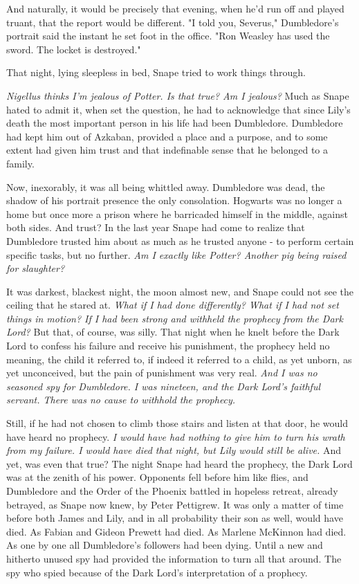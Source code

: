 And naturally, it would be precisely that evening, when he'd run off and played truant, that the report would be different. "I told you, Severus," Dumbledore's portrait said the instant he set foot in the office. "Ron Weasley has used the sword. The locket is destroyed."

That night, lying sleepless in bed, Snape tried to work things through.

\emph{Nigellus thinks I'm jealous of Potter. Is that true? Am I jealous?} Much as Snape hated to admit it, when set the question, he had to acknowledge that since Lily's death the most important person in his life had been Dumbledore. Dumbledore had kept him out of Azkaban, provided a place and a purpose, and to some extent had given him trust and that indefinable sense that he belonged to a family.

Now, inexorably, it was all being whittled away. Dumbledore was dead, the shadow of his portrait presence the only consolation. Hogwarts was no longer a home but once more a prison where he barricaded himself in the middle, against both sides. And trust? In the last year Snape had come to realize that Dumbledore trusted him about as much as he trusted anyone - to perform certain specific tasks, but no further. \emph{Am I exactly like Potter? Another pig being raised for slaughter?}

It was darkest, blackest night, the moon almost new, and Snape could not see the ceiling that he stared at. \emph{What if I had done differently? What if I had not set things in motion? If I had been strong and withheld the prophecy from the Dark Lord?} But that, of course, was silly. That night when he knelt before the Dark Lord to confess his failure and receive his punishment, the prophecy held no meaning, the child it referred to, if indeed it referred to a child, as yet unborn, as yet unconceived, but the pain of punishment was very real. \emph{And I was no seasoned spy for Dumbledore. I was nineteen, and the Dark Lord's faithful servant. There was no cause to withhold the prophecy.}

Still, if he had not chosen to climb those stairs and listen at that door, he would have heard no prophecy. \emph{I would have had nothing to give him to turn his wrath from my failure. I would have died that night, but Lily would still be alive.} And yet, was even that true? The night Snape had heard the prophecy, the Dark Lord was at the zenith of his power. Opponents fell before him like flies, and Dumbledore and the Order of the Phoenix battled in hopeless retreat, already betrayed, as Snape now knew, by Peter Pettigrew. It was only a matter of time before both James and Lily, and in all probability their son as well, would have died. As Fabian and Gideon Prewett had died. As Marlene McKinnon had died. As one by one all Dumbledore's followers had been dying. Until a new and hitherto unused spy had provided the information to turn all that around. The spy who spied because of the Dark Lord's interpretation of a prophecy.

